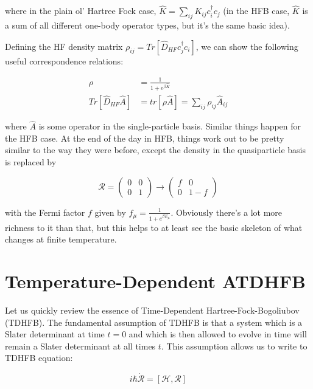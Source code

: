 \noindent where in the plain ol' Hartree Fock case, $\hat{K} = \sum_{ij}K_{ij}c_i^\dagger c_j$ (in the HFB case, $\hat{K}$ is a sum of all different one-body operator types, but it's the same basic idea).

Defining the HF density matrix $\rho_{ij}=Tr\left[\hat{D}_{HF}c_j^\dagger c_i\right]$, we can show the following useful correspondence relations:

\begin{align*}
\rho &= \frac{1}{1+e^{\beta\hat{K}}} \\
Tr\left[\hat{D}_{HF}\hat{A}\right] &= tr\left[\rho\hat{A}\right] = \sum_{ij}\rho_{ij}\hat{A}_{ij}
\end{align*}

\noindent where $\hat{A}$ is some operator in the single-particle basis. Similar things happen for the HFB case. At the end of the day in HFB, things work out to be pretty similar to the way they were before, except the density in the quasiparticle basis is replaced by

\begin{equation*}
\mathcal{R} =
\left(\begin{array}{cc}
0 & 0 \\
0 & 1
\end{array}\right)
\rightarrow
\left(\begin{array}{cc}
f & 0 \\
0 & 1-f
\end{array}\right)
\end{equation*}

\noindent with the Fermi factor $f$ given by $f_\mu=\frac{1}{1+e^{\beta E_\mu}}$. Obviously there's a lot more richness to it than that, but this helps to at least see the basic skeleton of what changes at finite temperature.

\section{Temperature-Dependent ATDHFB}

Let us quickly review the essence of Time-Dependent Hartree-Fock-Bogoliubov (TDHFB). The fundamental assumption of TDHFB is that a system which is a Slater determinant at time $t=0$ and which is then allowed to evolve in time will remain a Slater determinant at all times $t$. This assumption allows us to write to TDHFB equation:

\begin{equation*}
i\hbar \mathcal{\dot{R}} = \left[\mathcal{H},\mathcal{R}\right]
\end{equation*}

